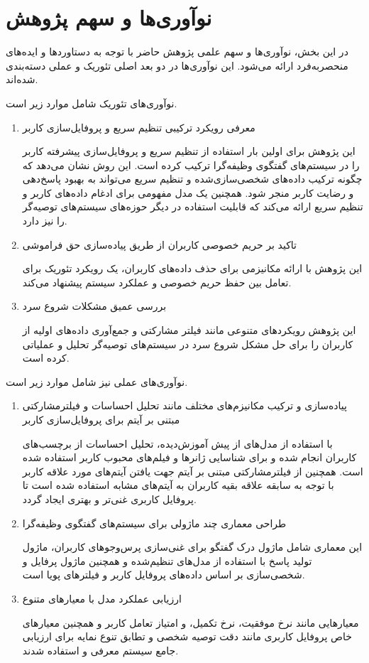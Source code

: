 \section{نوآوری‌ها و سهم پژوهش}

در این بخش، نوآوری‌ها و سهم علمی پژوهش حاضر با توجه به دستاوردها و ایده‌های منحصربه‌فرد ارائه می‌شود. این نوآوری‌ها در دو بعد اصلی تئوریک و عملی دسته‌بندی شده‌اند.


نوآوری‌های تئوریک شامل موارد زیر است.
\begin{enumerate}
\item
معرفی رویکرد ترکیبی تنظیم سریع و پروفایل‌سازی کاربر

این پژوهش برای اولین بار استفاده از تنظیم سریع و پروفایل‌سازی پیشرفته کاربر را در سیستم‌های گفتگوی وظیفه‌گرا ترکیب کرده است. این روش نشان می‌دهد که چگونه ترکیب داده‌های شخصی‌سازی‌شده و تنظیم سریع می‌تواند به بهبود پاسخ‌دهی و رضایت کاربر منجر شود. همچنین یک مدل مفهومی برای ادغام داده‌های کاربر و تنظیم سریع ارائه می‌کند که قابلیت استفاده در دیگر حوزه‌های سیستم‌های توصیه‌گر را نیز دارد.
\item
تاکید بر حریم خصوصی کاربران از طریق پیاده‌سازی حق فراموشی

این پژوهش با ارائه مکانیزمی برای حذف داده‌های کاربران، یک رویکرد تئوریک برای تعامل بین حفظ حریم خصوصی و عملکرد سیستم پیشنهاد می‌کند.

\item
بررسی عمیق مشکلات شروع سرد

این پژوهش رویکردهای متنوعی مانند فیلتر مشارکتی و جمع‌آوری داده‌های اولیه از کاربران را برای حل مشکل شروع سرد در سیستم‌های توصیه‌گر تحلیل و عملیاتی کرده است.
\end{enumerate}



نوآوری‌های عملی نیز شامل موارد زیر است.
\begin{enumerate}
\item
پیاده‌سازی و ترکیب مکانیزم‌های مختلف مانند تحلیل احساسات و فیلترمشارکتی مبتنی بر آیتم برای پروفایل‌سازی کاربر

با استفاده از مدل‌های از پیش آموزش‌دیده، تحلیل احساسات از برچسب‌های کاربران انجام شده و برای شناسایی ژانرها و فیلم‌های محبوب کاربر استفاده شده است. همچنین از فیلترمشارکتی مبتنی بر آیتم جهت یافتن آیتم‌های مورد علاقه کاربر با توجه به سابقه علاقه بقیه کاربران به آیتم‌های مشابه استفاده شده است تا پروفایل کاربری غنی‌تر و بهتری ایجاد گردد.

\item
طراحی معماری چند ماژولی برای سیستم‌های گفتگوی وظیفه‌گرا

این معماری شامل ماژول درک گفتگو برای غنی‌سازی پرس‌وجوهای کاربران، ماژول تولید پاسخ با استفاده از مدل‌های تنظیم‌شده و همچنین ماژول پرفایل و شخصی‌سازی بر اساس داده‌های پروفایل کاربر و فیلترهای پویا است.

\item
ارزیابی عملکرد مدل با معیارهای متنوع

معیارهایی مانند نرخ موفقیت، نرخ تکمیل، و امتیاز تعامل کاربر و همچنین معیارهای خاص پروفایل کاربری مانند دقت توصیه شخصی و تطابق تنوع نمایه برای ارزیابی جامع سیستم معرفی و استفاده شدند.
\end{enumerate}



